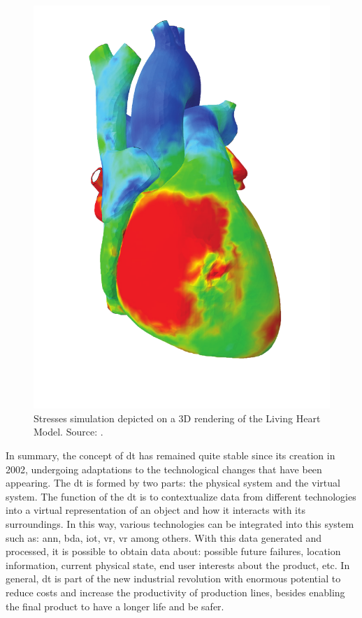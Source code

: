 \begin{figure}[ht!]
    \centering
    \includegraphics[scale=0.65]{images/Related/heart.png}
    \caption{Stresses  simulation depicted on a 3D rendering of the Living Heart Model. Source: \cite{Levine2022}.}

    \label{fig:digitalTwinHeart}
\end{figure}


In summary, the concept of \acrfull{dt} has remained quite stable since its creation in 2002, undergoing adaptations to the technological changes that have been appearing. The \acrshort{dt} is formed by two parts: the physical system and the virtual system. The function of the \acrshort{dt} is to contextualize data from different technologies into a virtual representation of an object and how it interacts with its surroundings. In this way, various technologies can be integrated into this system such as: \acrlong{ann}, \acrlong{bda}, \acrlong{iot}, \acrlong{vr}, \acrlong{vr} among others. With this data generated and processed, it is possible to obtain data about: possible future failures, location information, current physical state, end user interests about the product, etc. In general, \acrshort{dt} is part of the new industrial revolution with enormous potential to reduce costs and increase the productivity of production lines, besides enabling the final product to have a longer life and be safer. 
